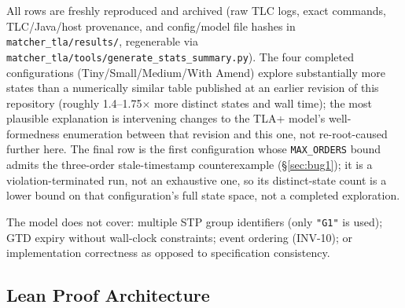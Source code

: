 \documentclass[11pt,a4paper]{article}
\begin{document}
\begin{table}[H]
\centering
\caption{Model checking configurations and statistics.}
\label{tab:configs}
\small
{}

\medskip
\raggedright\footnotesize
All rows are freshly reproduced and archived (raw TLC logs, exact commands,
TLC/Java/host provenance, and config/model file hashes in
\texttt{matcher\_tla/results/}, regenerable via
\texttt{matcher\_tla/tools/generate\_stats\_summary.py}). The four completed
configurations (Tiny/Small/Medium/With Amend) explore substantially more
states than a numerically similar table published at an earlier revision of
this repository (roughly 1.4--1.75$\times$ more distinct states and wall
time); the most plausible explanation is intervening changes to the TLA+
model's well-formedness enumeration between that revision and this one, not
re-root-caused further here. The final row is the first configuration whose
\texttt{MAX\_ORDERS} bound admits the three-order stale-timestamp
counterexample (\S\ref{sec:bug1}); it is a violation-terminated run, not an
exhaustive one, so its distinct-state count is a lower bound on that
configuration's full state space, not a completed exploration.
\end{table}

The model does not cover: multiple STP group identifiers (only
\texttt{"G1"} is used); GTD expiry without wall-clock constraints;
event ordering (INV-10); or implementation correctness as opposed to
specification consistency.

\subsection{Lean Proof Architecture}
\label{sec:lean-arch}
\end{document}

